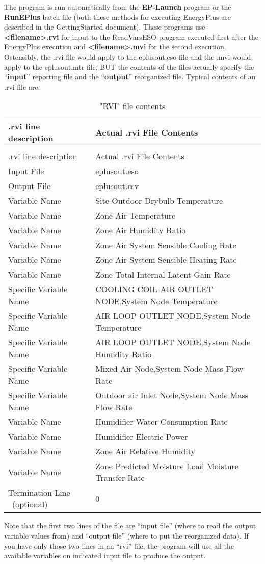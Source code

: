 The program is run automatically from the \textbf{EP-Launch} program or the \textbf{RunEPlus} batch file (both these methods for executing EnergyPlus are described in the GettingStarted document). These programs use \textbf{\textless{}filename\textgreater{}.rvi} for input to the ReadVarsESO program executed first after the EnergyPlus execution and \textbf{\textless{}filename\textgreater{}.mvi} for the second execution. Ostensibly, the .rvi file would apply to the eplusout.eso file and the .mvi would apply to the eplusout.mtr file, BUT the contents of the files actually specify the ``\textbf{input}'' reporting file and the ``\textbf{output}'' reorganized file. Typical contents of an .rvi file are:

\begin{longtable}[c]{p{2.1in}p{3.9in}}
\caption{"RVI" file contents \label{table:rvi-file-contents}} \tabularnewline
\toprule
.rvi line description & Actual .rvi File Contents \tabularnewline
\midrule
\endfirsthead

\caption[]{"RVI" file contents} \tabularnewline
\toprule
.rvi line description & Actual .rvi File Contents \tabularnewline
\midrule
\endhead

Input File & eplusout.eso \tabularnewline
Output File & eplusout.csv \tabularnewline
Variable Name & Site Outdoor Drybulb Temperature \tabularnewline
Variable Name & Zone Air Temperature \tabularnewline
Variable Name & Zone Air Humidity Ratio \tabularnewline
Variable Name & Zone Air System Sensible Cooling Rate \tabularnewline
Variable Name & Zone Air System Sensible Heating Rate \tabularnewline
Variable Name & Zone Total Internal Latent Gain Rate \tabularnewline
Specific Variable Name & COOLING COIL AIR OUTLET NODE,System Node Temperature \tabularnewline
Specific Variable Name & AIR LOOP OUTLET NODE,System Node Temperature \tabularnewline
Specific Variable Name & AIR LOOP OUTLET NODE,System Node Humidity Ratio \tabularnewline
Specific Variable Name & Mixed Air Node,System Node Mass Flow Rate \tabularnewline
Specific Variable Name & Outdoor air Inlet Node,System Node Mass Flow Rate \tabularnewline
Variable Name & Humidifier Water Consumption Rate \tabularnewline
Variable Name & Humidifier Electric Power \tabularnewline
Variable Name & Zone Air Relative Humidity \tabularnewline
Variable Name & Zone Predicted Moisture Load Moisture Transfer Rate \tabularnewline
Termination Line ~(optional) & 0 \tabularnewline
\bottomrule
\end{longtable}

Note that the first two lines of the file are ``input file'' (where to read the output variable values from) and ``output file'' (where to put the reorganized data). If you have only those two lines in an ``rvi'' file, the program will use all the available variables on indicated input file to produce the output.

